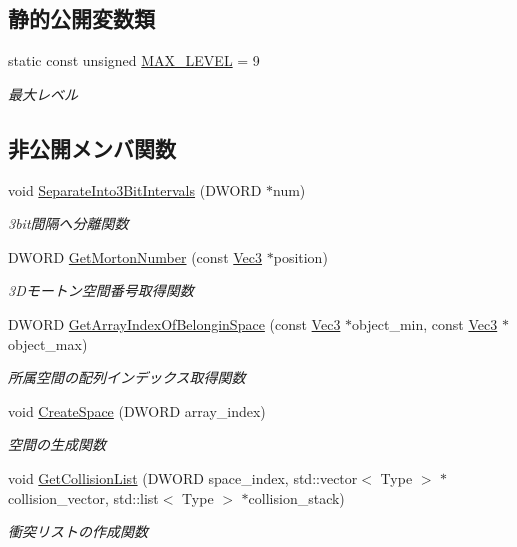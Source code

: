 \subsection*{静的公開変数類}
\begin{DoxyCompactItemize}
\item 
static const unsigned \mbox{\hyperlink{class_liner_octree_aced865f2822181486eb805e4db1f0a32}{M\+A\+X\+\_\+\+L\+E\+V\+EL}} = 9
\begin{DoxyCompactList}\small\item\em 最大レベル \end{DoxyCompactList}\end{DoxyCompactItemize}
\subsection*{非公開メンバ関数}
\begin{DoxyCompactItemize}
\item 
void \mbox{\hyperlink{class_liner_octree_acfa567ec0f969684f55443fc9ee98432}{Separate\+Into3\+Bit\+Intervals}} (D\+W\+O\+RD $\ast$num)
\begin{DoxyCompactList}\small\item\em 3bit間隔へ分離関数 \end{DoxyCompactList}\item 
D\+W\+O\+RD \mbox{\hyperlink{class_liner_octree_ad931e5f3ae94cd4337dd96d133ee42a8}{Get\+Morton\+Number}} (const \mbox{\hyperlink{_vector3_d_8h_ab16f59e4393f29a01ec8b9bbbabbe65d}{Vec3}} $\ast$position)
\begin{DoxyCompactList}\small\item\em 3\+Dモートン空間番号取得関数 \end{DoxyCompactList}\item 
D\+W\+O\+RD \mbox{\hyperlink{class_liner_octree_a4d7c6e47990d16ed28e3ab89443c1af4}{Get\+Array\+Index\+Of\+Belongin\+Space}} (const \mbox{\hyperlink{_vector3_d_8h_ab16f59e4393f29a01ec8b9bbbabbe65d}{Vec3}} $\ast$object\+\_\+min, const \mbox{\hyperlink{_vector3_d_8h_ab16f59e4393f29a01ec8b9bbbabbe65d}{Vec3}} $\ast$object\+\_\+max)
\begin{DoxyCompactList}\small\item\em 所属空間の配列インデックス取得関数 \end{DoxyCompactList}\item 
void \mbox{\hyperlink{class_liner_octree_a62aa42a787a399c3651bac3bbef8f1a6}{Create\+Space}} (D\+W\+O\+RD array\+\_\+index)
\begin{DoxyCompactList}\small\item\em 空間の生成関数 \end{DoxyCompactList}\item 
void \mbox{\hyperlink{class_liner_octree_ac74ebba8b5f12fa94745a899b222e2b6}{Get\+Collision\+List}} (D\+W\+O\+RD space\+\_\+index, std\+::vector$<$ Type $>$ $\ast$collision\+\_\+vector, std\+::list$<$ Type $>$ $\ast$collision\+\_\+stack)
\begin{DoxyCompactList}\small\item\em 衝突リストの作成関数 \end{DoxyCompactList}\end{DoxyCompactItemize}
